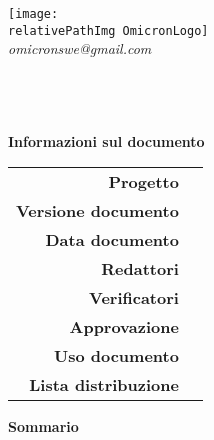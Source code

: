 \begin{titlepage} 

\begin{center}
\texttt{[image: \\relativePathImg OmicronLogo]} \\
\textit{omicronswe@gmail.com}\\[0.7cm]
\HRule \\[0.7cm] \textbf{\huge \doctitle}\\[0.4cm] \HRule \\[1.5cm] 
\par\end{center}{\huge \par}

\begin{center}
	\textbf{\Large Informazioni sul documento} \\[0.5cm]
	\begin{longtable}{ r | p{5cm} }
		\textbf{Progetto} & \nameproject \\
		\textbf{Versione documento} & \versiondoc \\
		\textbf{Data documento} & \datared \\
		\textbf{Redattori} & \parbox[t]{\textwidth}{\redattore} \\[0.5cm]
		\textbf{Verificatori} & \parbox[t]{\textwidth}{\verificatori} \\[0.5cm]
		\textbf{Approvazione} & \approvazione \\
		\textbf{Uso documento} & \usodoc \\
		\textbf{Lista distribuzione} & \parbox[t]{\textwidth}{\listadistr} \\
	\end{longtable}
\vspace{0.7cm}
\textbf{\Large Sommario} \\[0.4cm]
\testosommario
\end{center}%

\end{titlepage} 

